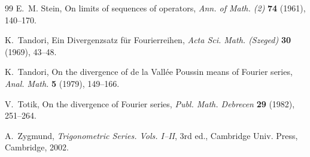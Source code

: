 \documentclass[11pt]{amsart}
\numberwithin{equation}{section}
\theoremstyle{plain}
\begin{document}
\begin{thebibliography}{99}
 E.~M. Stein, On limits of sequences of operators, \emph{Ann.
of Math. (2)} \textbf{74} (1961), 140--170.

 K.~Tandori, Ein Divergenzsatz f\"ur
Fourierreihen, \emph{Acta Sci. Math. (Szeged)} \textbf{30} (1969), 43--48.

 K.~Tandori, On the divergence of de la Vall\'ee Poussin
means of Fourier series, \emph{Anal. Math.} \textbf{5} (1979), 149--166.

 V.~Totik, On the divergence of Fourier series, \emph{Publ.
Math. Debrecen} \textbf{29} (1982), 251--264.

 A.~Zygmund, \emph{Trigonometric Series. Vols. I--II}, 3rd
ed., Cambridge Univ. Press, Cambridge, 2002.
\end{thebibliography}
\end{document}
